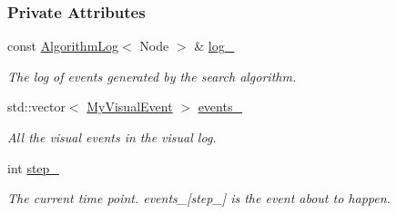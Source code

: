 \subsubsection*{Private Attributes}
\begin{DoxyCompactItemize}
\item 
const \hyperlink{structAlgorithmLog}{Algorithm\+Log}$<$ Node $>$ \& \hyperlink{structVisualLog_ac7b9ff183356aa00e2df514b17a3bff0}{log\+\_\+}\hypertarget{structVisualLog_ac7b9ff183356aa00e2df514b17a3bff0}{}\label{structVisualLog_ac7b9ff183356aa00e2df514b17a3bff0}

\begin{DoxyCompactList}\small\item\em The log of events generated by the search algorithm. \end{DoxyCompactList}\item 
std\+::vector$<$ \hyperlink{structVisualLog_a4becdb7d1f763e250a3ace276b111bcb}{My\+Visual\+Event} $>$ \hyperlink{structVisualLog_aeca37da4d221304c6722d79ba495f985}{events\+\_\+}\hypertarget{structVisualLog_aeca37da4d221304c6722d79ba495f985}{}\label{structVisualLog_aeca37da4d221304c6722d79ba495f985}

\begin{DoxyCompactList}\small\item\em All the visual events in the visual log. \end{DoxyCompactList}\item 
int \hyperlink{structVisualLog_a3edc9473cbc013a647c2a5ba871df204}{step\+\_\+}\hypertarget{structVisualLog_a3edc9473cbc013a647c2a5ba871df204}{}\label{structVisualLog_a3edc9473cbc013a647c2a5ba871df204}

\begin{DoxyCompactList}\small\item\em The current time point. events\+\_\+\mbox{[}step\+\_\+\mbox{]} is the event about to happen. \end{DoxyCompactList}\end{DoxyCompactItemize}
